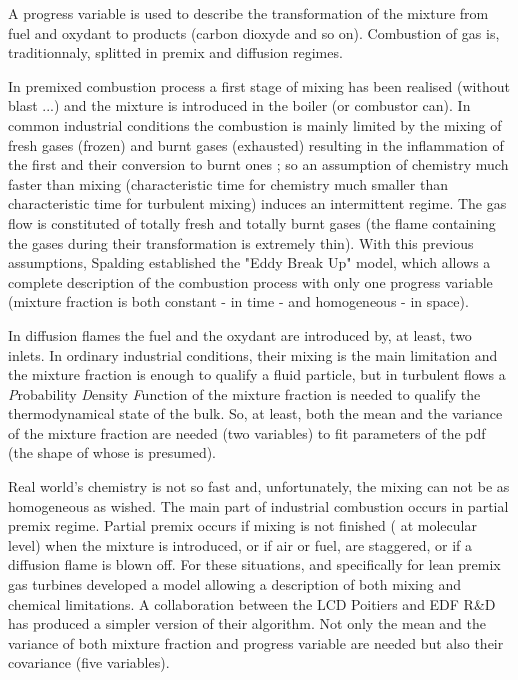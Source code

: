 A progress variable is used to describe the transformation of the mixture from
fuel and oxydant to products (carbon dioxyde and so on).
Combustion of gas is, traditionnaly, splitted in premix and diffusion regimes.

In premixed combustion process a first stage of mixing has been realised
(without blast ...) and the mixture is introduced in the boiler (or combustor
can). In common industrial conditions the combustion is mainly limited by the
mixing of fresh gases (frozen) and burnt gases (exhausted) resulting in the
inflammation of the first and their conversion to burnt ones ; so an assumption
of chemistry much faster than mixing (characteristic time for chemistry much
smaller than characteristic time for turbulent mixing) induces an intermittent
regime. The gas flow is constituted of totally fresh and totally burnt gases
(the flame containing the gases during their transformation is extremely
thin). With this previous assumptions, Spalding \cite{Spalding:1971a} established the "Eddy
Break Up" model, which allows a complete description of the combustion process
with only one progress variable (mixture fraction is both constant
- in time - and homogeneous - in space).

In diffusion flames the fuel and the oxydant are introduced by, at least, two
inlets. In ordinary industrial conditions, their mixing is the main limitation
and the mixture fraction is enough to qualify a fluid particle, but in turbulent
flows a {\em P}robability {\em D}ensity {\em F}unction of the mixture fraction
is needed to qualify the thermodynamical state of the bulk. So, at least, both
the mean and the variance of the mixture fraction are needed (two variables) to
fit parameters of the pdf (the shape of whose is presumed).

Real world's chemistry is not so fast and, unfortunately, the mixing can not be
as homogeneous as wished. The main part of industrial combustion occurs in
partial premix regime. Partial premix occurs if mixing is not finished ( at
molecular level) when the mixture is introduced, or if air or fuel, are
staggered, or if a diffusion flame is blown off. For these situations, and
specifically for lean premix gas turbines \cite{Libby:2000a} developed a model allowing a
description of both mixing and chemical limitations. A collaboration between the
LCD Poitiers \cite{Ribert:2004a} and EDF R\&D has produced a simpler version of their
algorithm. Not only the mean and the variance of both mixture fraction and
progress variable are needed but also their covariance (five variables).


